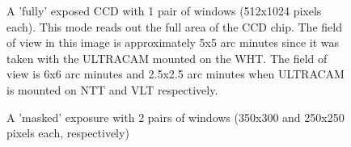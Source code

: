 \begin{figure}
  \centering
  \setlength{\fboxsep}{0pt}
  \setlength{\fboxrule}{1pt}
  \caption{A 'fully' exposed CCD with 1 pair of windows (512x1024 pixels each).  This mode reads out the full area of the CCD chip. The field of view in this image is approximately 5x5 arc minutes since it was taken with the ULTRACAM mounted on the WHT. The field of view is 6x6 arc minutes and 2.5x2.5 arc minutes when ULTRACAM is mounted on NTT and VLT respectively.}
  \label{fig:KOI-824}
\end{figure}

\begin{figure}  
  \centering
  \setlength{\fboxsep}{0pt}
  \setlength{\fboxrule}{1pt}
  \caption{A 'masked' exposure with 2 pairs of windows (350x300 and 250x250 pixels each, respectively)}
  \label{fig:V713Cep}
\end{figure}

